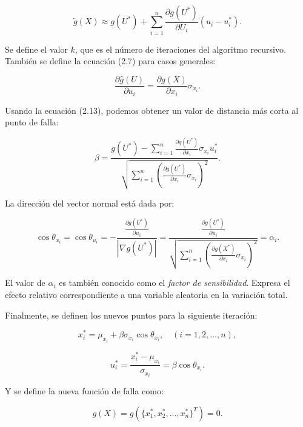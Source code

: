 \begin{equation}
\tilde{g}(X) \approx g(U^*) + \sum_{i=1}^{n} \frac{\partial g(U^*)}{\partial U_i} (u_i - u_i^*).
\end{equation}

Se define el valor \(k\), que es el número de iteraciones del algoritmo recursivo. También se define la ecuación (2.7) para casos generales:

\begin{equation}
\frac{\partial \hat{g}(U)}{\partial u_i} = \frac{\partial g(X)}{\partial x_i} \sigma_{x_i}.
\end{equation}

Usando la ecuación (2.13), podemos obtener un valor de distancia más corta al punto de falla:

\begin{equation}
\beta = \frac{g(U^*) - \sum_{i=1}^{n} \frac{\partial g(U^*)}{\partial x_i} \sigma_{x_i} u_i^*}{\sqrt{\sum_{i=1}^{n} \left(\frac{\partial g(U^*)}{\partial x_i} \sigma_{x_i}\right)^2}}.
\end{equation}

La dirección del vector normal está dada por:

\begin{equation}
\cos \theta_{x_i} = \cos \theta_{u_i} = -\frac{\frac{\partial g(U^*)}{\partial u_i}}{|\nabla g(U^*)|} = \frac{\frac{\partial g(U^*)}{\partial u_i}}{\sqrt{\sum_{i=1}^{n} \left(\frac{\partial g(X^*)}{\partial x_i} \sigma_{x_i}\right)^2}} = \alpha_i.
\end{equation}

El valor de \(\alpha_i\) es también conocido como el \textit{factor de sensibilidad}. Expresa el efecto relativo correspondiente a una variable aleatoria en la variación total.

Finalmente, se definen los nuevos puntos para la siguiente iteración:

\begin{equation}
x_i^* = \mu_{x_i} + \beta \sigma_{x_i} \cos \theta_{x_i}, \quad (i = 1, 2, \dots, n),
\end{equation}

\begin{equation}
u_i^* = \frac{x_i^* - \mu_{x_i}}{\sigma_{x_i}} = \beta \cos \theta_{x_i}.
\end{equation}

Y se define la nueva función de falla como:

\begin{equation}
g(X) = g\left(\{x_1^*, x_2^*, \dots, x_n^*\}^T\right) = 0.
\end{equation}

